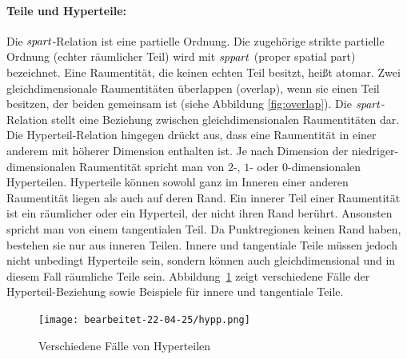     \paragraph{Teile und Hyperteile:}
        Die
        $\mathit{spart}$-Relation ist eine partielle Ordnung. Die zugehörige strikte partielle Ordnung (echter räumlicher Teil) wird mit $\mathit{sppart}$ (proper spatial part) bezeichnet.
        Eine Raumentität, die keinen echten Teil besitzt, heißt atomar.
        Zwei gleichdimensionale Raumentitäten überlappen (overlap), wenn sie einen Teil besitzen, der beiden gemeinsam ist (siehe Abbildung \ref{fig:overlap}).
        Die $\mathit{spart}$-Relation stellt eine Beziehung zwischen gleichdimensionalen Raumentitäten dar.
        Die Hyperteil-Relation hingegen drückt aus, dass eine Raumentität in einer anderem mit höherer Dimension enthalten ist.
        Je nach Dimension der niedriger-dimensionalen Raumentität spricht man von $2$-, $1$- oder $0$-dimensionalen Hyperteilen.
        Hyperteile können sowohl ganz im Inneren einer anderen Raumentität liegen als auch auf deren Rand.
        Ein innerer Teil einer Raumentität ist ein räumlicher oder ein Hyperteil, der nicht ihren Rand berührt. 
        Ansonsten spricht man von einem tangentialen Teil.
        Da Punktregionen keinen Rand haben, bestehen sie nur aus inneren Teilen.
        Innere und tangentiale Teile müssen jedoch nicht unbedingt Hyperteile sein, sondern können auch gleichdimensional und in diesem Fall räumliche Teile sein.
        Abbildung~\ref{fig:hypp} zeigt verschiedene Fälle der Hyperteil-Beziehung sowie Beispiele für innere und tangentiale Teile.
        
        \begin{figure}[ht]
            \centering
            \texttt{[image: bearbeitet-22-04-25/hypp.png]}
            \caption{Verschiedene Fälle von Hyperteilen}
            \label{fig:hypp}
        \end{figure}

